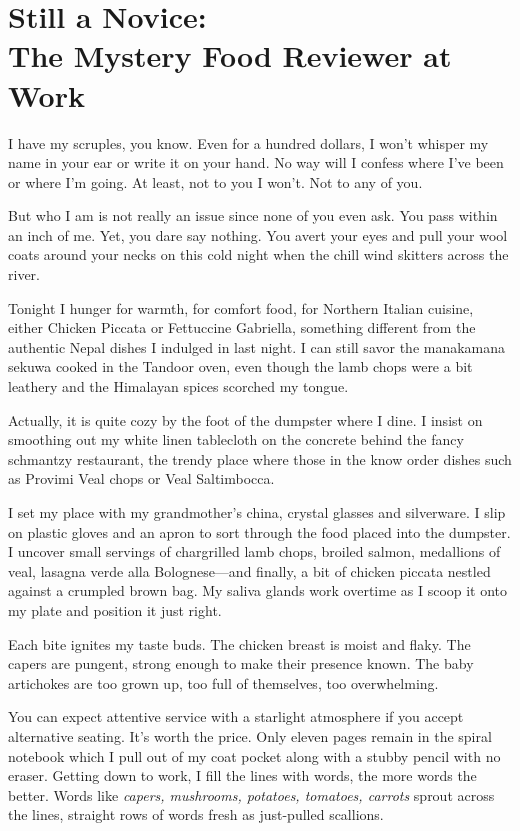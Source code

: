 \documentclass[twoside,10pt]{book}
\begin{document}
\cleardoublepage
\chapter{Still a Novice:\\
The Mystery Food Reviewer at Work}

I have my scruples, you know. Even for a hundred dollars, I won't
whisper my name in your ear or write it on your hand. No way will I
confess where I've been or where I'm going. At least, not to you I
won't. Not to any of you.

But who I am is not really an issue since none of you even ask. You pass
within an inch of me. Yet, you dare say nothing. You avert your eyes and
pull your wool coats around your necks on this cold night when the chill
wind skitters across the river.

Tonight I hunger for warmth, for comfort food, for Northern Italian
cuisine, either Chicken Piccata or Fettuccine Gabriella, something
different from the authentic Nepal dishes I indulged in last night. I
can still savor the manakamana sekuwa cooked in the Tandoor oven, even
though the lamb chops were a bit leathery and the Himalayan spices
scorched my tongue.

Actually, it is quite cozy by the foot of the dumpster where I dine. I
insist on smoothing out my white linen tablecloth on the concrete behind
the fancy schmantzy restaurant, the trendy place where those in the know
order dishes such as Provimi Veal chops or Veal Saltimbocca.

I set my place with my grandmother's china, crystal glasses and
silverware. I slip on plastic gloves and an apron to sort through the
food placed into the dumpster. I uncover small servings of chargrilled
lamb chops, broiled salmon, medallions of veal, lasagna verde alla
Bolognese---and finally, a bit of chicken piccata nestled against a
crumpled brown bag. My saliva glands work overtime as I scoop it onto my
plate and position it just right.

Each bite ignites my taste buds. The chicken breast is moist and flaky.
The capers are pungent, strong enough to make their presence known. The
baby artichokes are too grown up, too full of them­selves, too
overwhelming.

You can expect attentive service with a starlight atmosphere if you
accept alternative seating. It's worth the price. Only eleven pages
remain in the spiral notebook which I pull out of my coat pocket along
with a stubby pencil with no eraser. Getting down to work, I fill the
lines with words, the more words the better. Words like \emph{capers,
mushrooms, potatoes, tomatoes, carrots} sprout across the lines,
straight rows of words fresh as just-pulled scallions.
\end{document}
